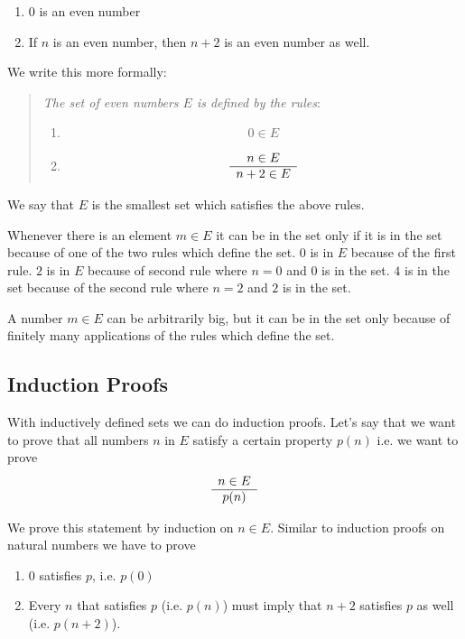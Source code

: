 \begin{enumerate}
\item $0$ is an even number

\item If $n$ is an even number, then $n+2$ is an even number as well.
\end{enumerate}

We write this more formally:

\begin{quote}

\emph{The set of even numbers $E$ is defined by the rules}:
    \begin{enumerate}
    \item $$ 0 \in E$$

    \item
        $$
        \begin{array}{c} n \in E \\ \hline n+2 \in E\end{array}
        $$
    \end{enumerate}
\end{quote}

We say that $E$ is the smallest set which satisfies the above rules.

Whenever there is an element $m \in E$ it can be in the set only if it is in the
set because of one of the two rules which define the set. $0$ is in $E$ because
of the first rule. $2$ is in $E$ because of second rule where $n = 0$ and $0$ is
in the set. $4$ is in the set because of the second rule where $n = 2$ and $2$
is in the set.

A number $m \in E$ can be arbitrarily big, but it can be in the set only because
of finitely many applications of the rules which define the set.




\subsection{Induction Proofs}

With inductively defined sets we can do induction proofs. Let's say that we want
to prove that all numbers $n$ in $E$ satisfy a certain property $p(n)$ i.e. we
want to prove
$$
\begin{array}{c} n \in E \\ \hline p(n)\end{array}
$$

We prove this statement by induction on $n \in E$. Similar to induction proofs
on natural numbers we have to prove

\begin{enumerate}
\item $0$ satisfies $p$, i.e. $p(0)$

\item Every $n$ that satisfies $p$ (i.e. $p(n)$) must imply that $n+2$ satisfies
$p$ as well (i.e. $p(n+2)$).

\end{enumerate}


